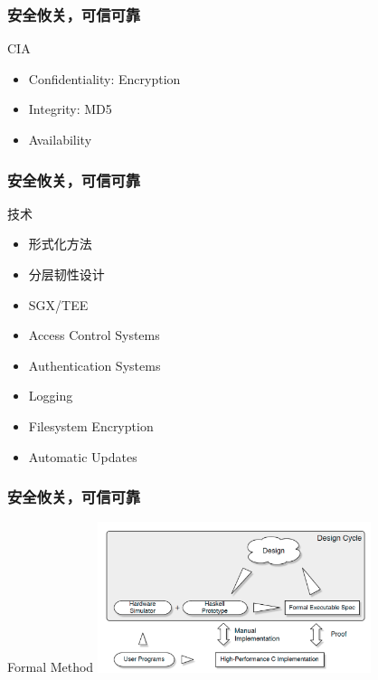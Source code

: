 \begin{frame}
\frametitle{安全攸关，可信可靠}
\begin{block}{CIA}
\begin{itemize}
	\item Confidentiality: Encryption
	\item Integrity: MD5
	\item Availability
\end{itemize} 
\end{block}
\end{frame}





\begin{frame}
\frametitle{安全攸关，可信可靠}
\begin{block}{技术}
\begin{itemize}
	\item 形式化方法
	\item 分层韧性设计
	\item SGX/TEE
	\item Access Control Systems
	\item Authentication Systems
	\item Logging
	\item Filesystem Encryption
	\item Automatic Updates
\end{itemize} 
\end{block}
\end{frame}



\begin{frame}
\frametitle{安全攸关，可信可靠}
\begin{block}{Formal Method}
\centering
\includegraphics[width=0.6\textwidth]{fig23/formal.jpg}
\end{block}
\end{frame}

